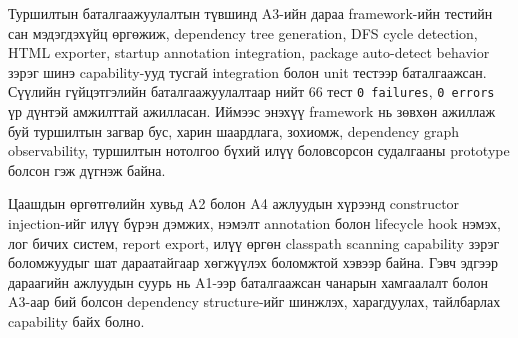 Туршилтын баталгаажуулалтын түвшинд A3-ийн дараа framework-ийн тестийн сан мэдэгдэхүйц өргөжиж, dependency tree generation, DFS cycle detection, HTML exporter, startup annotation integration, package auto-detect behavior зэрэг шинэ capability-ууд тусгай integration болон unit тестээр баталгаажсан. Сүүлийн гүйцэтгэлийн баталгаажуулалтаар нийт 66 тест \texttt{0 failures}, \texttt{0 errors} үр дүнтэй амжилттай ажилласан. Иймээс энэхүү framework нь зөвхөн ажиллаж буй туршилтын загвар бус, харин шаардлага, зохиомж, dependency graph observability, туршилтын нотолгоо бүхий илүү боловсорсон судалгааны prototype болсон гэж дүгнэж байна.

Цаашдын өргөтгөлийн хувьд A2 болон A4 ажлуудын хүрээнд constructor injection-ийг илүү бүрэн дэмжих, нэмэлт annotation болон lifecycle hook нэмэх, лог бичих систем, report export, илүү өргөн classpath scanning capability зэрэг боломжуудыг шат дараатайгаар хөгжүүлэх боломжтой хэвээр байна. Гэвч эдгээр дараагийн ажлуудын суурь нь A1-ээр баталгаажсан чанарын хамгаалалт болон A3-аар бий болсон dependency structure-ийг шинжлэх, харагдуулах, тайлбарлах capability байх болно.
